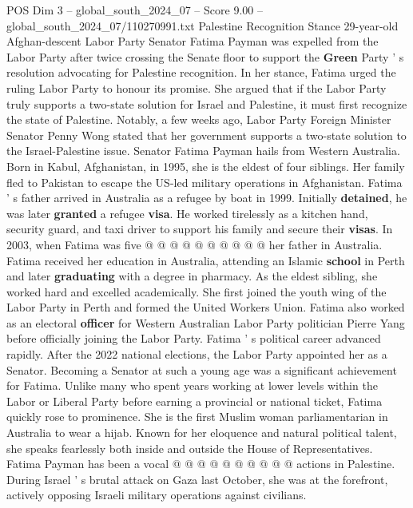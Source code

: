 \begin{textsample}{POS Dim 3 – global\_south\_2024\_07 – Score 9.00 – global\_south\_2024\_07/110270991.txt}  \label{ex:f3_pos_316}
Palestine Recognition Stance 29-year-old Afghan-descent Labor Party Senator Fatima Payman was expelled from the Labor Party after twice crossing the Senate floor to support the \textbf{Green} Party ' s resolution advocating for Palestine recognition.
In her stance, Fatima urged the ruling Labor Party to honour its promise.
She argued that if the Labor Party truly supports a two-state solution for Israel and Palestine, it must first recognize the state of Palestine.
Notably, a few weeks ago, Labor Party Foreign Minister Senator Penny Wong stated that her government supports a two-state solution to the Israel-Palestine issue.
Senator Fatima Payman hails from Western Australia.
Born in Kabul, Afghanistan, in 1995, she is the eldest of four siblings.
Her family fled to Pakistan to escape the US-led military operations in Afghanistan.
Fatima ' s father arrived in Australia as a refugee by boat in 1999.
Initially \textbf{detained}, he was later \textbf{granted} a refugee \textbf{visa}.
He worked tirelessly as a kitchen hand, security guard, and taxi driver to support his family and secure their \textbf{visas}.
In 2003, when Fatima was five @ @ @ @ @ @ @ @ @ @ her father in Australia.
Fatima received her education in Australia, attending an Islamic \textbf{school} in Perth and later \textbf{graduating} with a degree in pharmacy.
As the eldest sibling, she worked hard and excelled academically.
She first joined the youth wing of the Labor Party in Perth and formed the United Workers Union.
Fatima also worked as an electoral \textbf{officer} for Western Australian Labor Party politician Pierre Yang before officially joining the Labor Party.
Fatima ' s political career advanced rapidly.
After the 2022 national elections, the Labor Party appointed her as a Senator.
Becoming a Senator at such a young age was a significant achievement for Fatima.
Unlike many who spent years working at lower levels within the Labor or Liberal Party before earning a provincial or national ticket, Fatima quickly rose to prominence.
She is the first Muslim woman parliamentarian in Australia to wear a hijab.
Known for her eloquence and natural political talent, she speaks fearlessly both inside and outside the House of Representatives.
Fatima Payman has been a vocal @ @ @ @ @ @ @ @ @ @ actions in Palestine.
During Israel ' s brutal attack on Gaza last October, she was at the forefront, actively opposing Israeli military operations against civilians.

\end{textsample}
